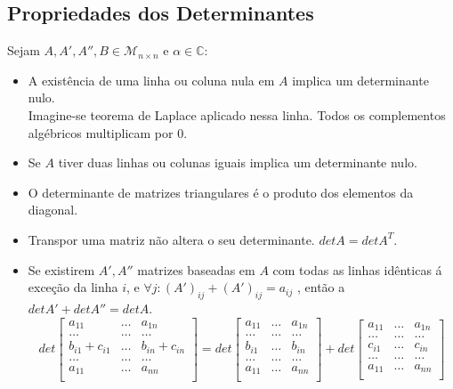 \documentclass[]{report}
\begin{document}
\subsection{Propriedades dos Determinantes}
Sejam $A, A', A'', B \in \mathcal{M}_{n \times n}$ e $\alpha \in \mathbb{C}$:
\begin{itemize}
\item A existência de uma linha ou coluna nula em $A$ implica um determinante nulo.\\
Imagine-se teorema de Laplace aplicado nessa linha. Todos os complementos algébricos multiplicam por 0.
\item Se $A$ tiver duas linhas ou colunas iguais implica um determinante nulo.
\item O determinante de matrizes triangulares é o produto dos elementos da diagonal.
\item Transpor uma matriz não altera o seu determinante. $det A = det A^T$.
\item Se existirem $A', A''$ matrizes baseadas em $A$ com todas as linhas idênticas á exceção da linha $i$, e $\forall j : (A')_{ij} + (A')_{ij} = a_{ij}$ , então a $det A' + det A'' = det A$.
$$
det
\begin{bmatrix}
a_{11} & \dots & a_{1n}\\
\dots & \dots & \dots \\
b_{i1} + c_{i1} & \dots & b_{in} + c_{in}\\
\dots & \dots & \dots \\
a_{11} & \dots & a_{nn}\\
\end{bmatrix}
=
det
\begin{bmatrix}
a_{11} & \dots & a_{1n}\\
\dots & \dots & \dots \\
b_{i1} & \dots & b_{in} \\
\dots & \dots & \dots \\
a_{11} & \dots & a_{nn}\\
\end{bmatrix}
+
det
\begin{bmatrix}
a_{11} & \dots & a_{1n}\\
\dots & \dots & \dots \\
c_{i1} & \dots & c_{in}\\
\dots & \dots & \dots \\
a_{11} & \dots & a_{nn}\\
\end{bmatrix}
$$
\end{itemize}
\end{document}
